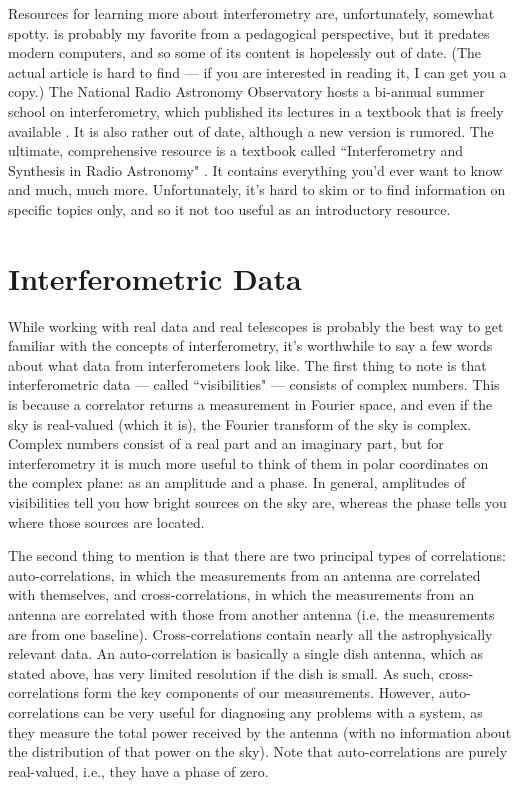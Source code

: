 Resources for learning more about interferometry are, unfortunately, somewhat spotty. 
\cite{fomalont_and_wright_1974} is probably my favorite from a pedagogical perspective, 
but it predates modern computers, and so some of its content is hopelessly out of date.  (The actual
article is hard to find --- if you are interested in reading it, I can get you a copy.)
The National Radio Astronomy Observatory hosts a bi-annual summer school on interferometry,
which published its lectures in a textbook that is freely available \citep{taylor_et_al_1999}.
It is also rather out of date, although a new version is rumored.
The ultimate, comprehensive resource is a textbook called ``Interferometry and Synthesis in
Radio Astronomy" \citep{thompson_et_al_2001}.  It contains everything you'd ever want to know
and much, much more.  Unfortunately, it's hard to skim or to find information on specific topics only,
and so it not too useful as an introductory resource.

\section{Interferometric Data}

While working with real data and real telescopes is probably the best way to get familiar
with the concepts of interferometry, it's worthwhile to say a few words about what data from
interferometers look like.  The first thing to note is that interferometric data ---
called ``visibilities" --- consists of complex numbers.  This is because a correlator
returns a measurement in Fourier space, and even if the sky is real-valued (which it is),
the Fourier transform of the sky is complex.  Complex numbers consist of a real part
and an imaginary part, but for interferometry it is much more useful to think of them
in polar coordinates on the complex plane: as an amplitude and a phase.  In general,
amplitudes of visibilities tell you how bright sources on the sky are, whereas the phase
tells you where those sources are located.

The second thing to mention is that there are two principal types of correlations:
auto-correlations, in which the measurements from an antenna are correlated with themselves,
and cross-correlations, in which the measurements from an antenna are correlated with
those from another antenna (i.e. the measurements are from one baseline).
Cross-correlations contain nearly all the astrophysically
relevant data.  An auto-correlation is basically a single dish antenna, which as stated above,
has very limited resolution if the dish is small.  As such, cross-correlations form the key
components of our measurements.  However, auto-correlations can be very useful for diagnosing
any problems with a system, as they measure the total power received by the antenna (with
no information about the distribution of that power on the sky).  Note that auto-correlations
are purely real-valued, i.e., they have a phase of zero.

